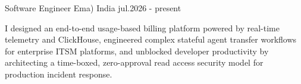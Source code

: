 
\begin{cventries}


    
    


		

	\cventry
	{Software Engineer} %
	{Ema)} %
	{India} %
	{jul.2026 - present} %
	{
		\begin{cvitems} %
			\item {I designed an end-to-end usage-based billing platform powered by real-time telemetry and ClickHouse, engineered complex stateful agent transfer workflows for enterprise ITSM platforms, and unblocked developer productivity by architecting a time-boxed, zero-approval read access security model for production incident response.}
		\end{cvitems}
	}


\end{cventries}
